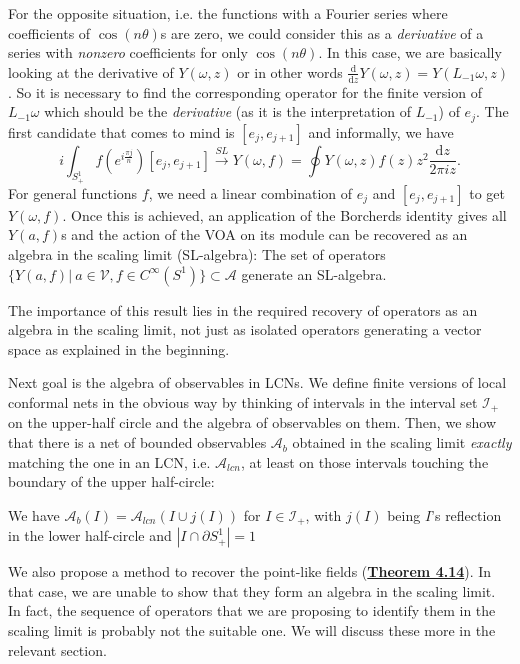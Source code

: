 \documentclass[twoside,11pt,titlepage]{amsart}
\newenvironment{customthm}[1]
  {\renewcommand\theinnercustomthm{#1}\innercustomthm}
  {\endinnercustomthm}
\renewcommand{\=}[1]{\stackrel{#1}{=}} %
\theoremstyle{definition}
\theoremstyle{remark}
\begin{document}
For the opposite situation, i.e. the functions with a Fourier series where coefficients of $\cos(n\theta)$s are zero, we could consider this as a \textit{derivative} of a series with \textit{nonzero} coefficients for only $\cos(n\theta)$. In this case, we are basically looking at the derivative of $Y(\omega,z)$ or in other words $\frac{\text{d}}{\text{d}z}Y(\omega,z)=Y(L_{-1}\omega,z)$. So it is necessary to find the corresponding operator for the finite version of $L_{-1}\omega$ which should be the \textit{derivative} (as it is the interpretation of $L_{-1}$) of $e_j$. The first candidate that comes to mind is $[e_{j},e_{j+1}]$ and informally, we have
$$i\int_{S^1_+} f(e^{i\frac{\pi j}{n}})[e_j,e_{j+1}] \xrightarrow{SL} Y(\omega,f)=\oint Y(\omega,z)f(z)z^2 \frac{\text{d}z}{2\pi i z}.$$
For general functions $f$, we need a linear combination of $e_j$ and $[e_j,e_{j+1}]$ to get $Y(\omega,f)$. Once this is achieved, an application of the Borcherds identity gives all $Y(a,f)$s and the action of the VOA on its module can be recovered as an algebra in the scaling limit (SL-algebra):
\begin{customthm}{4.8}
The set of operators $\{Y(a,f) | \ a \in \mathcal{V}, f \in C^\infty(S^1)\} \subset \mathcal{A}$ generate an SL-algebra. 
\end{customthm}

The importance of this result lies in the required recovery of operators as an algebra in the scaling limit, not just as isolated operators generating a vector space as explained in the beginning. 

Next goal is the algebra of observables in LCNs. We define finite versions of local conformal nets in the obvious way by thinking of intervals in the interval set $\mathcal{I}_+$ on the upper-half circle and the algebra of observables on them. Then, we show that there is a net of bounded observables $\mathcal{A}_b$ obtained in the scaling limit \textit{exactly} matching the one in an LCN, i.e. $\mathcal{A}_{lcn}$, at least on those intervals touching the boundary of the upper half-circle:

\begin{customthm}{4.13}
We have $\mathcal{A}_b(I)=\mathcal{A}_{lcn}(I \cup j(I))$ for $I \in \mathcal{I}_+$, with $j(I)$ being $I$'s reflection in the lower half-circle and $|I \cap \partial S^1_+|=1$
\end{customthm}

We also propose a method to recover the point-like fields (\hyperref[thm4.14]{\textbf{Theorem 4.14}}). In that case, we are unable to show that they form an algebra in the scaling limit. In fact, the sequence of operators that we are proposing to identify them in the scaling limit is probably not the suitable one. We will discuss these more in the relevant section.
\end{document}
